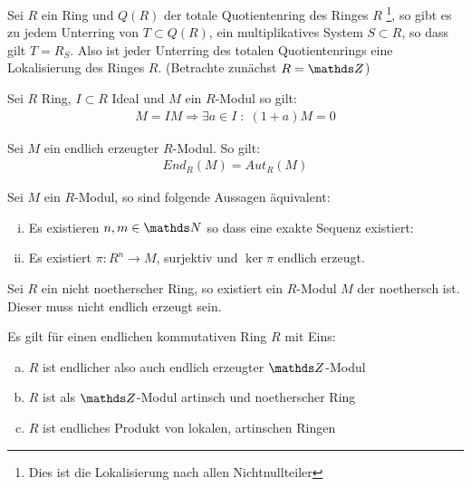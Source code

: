 \documentclass[ngerman, parskip=half, titlepage=false]{scrartcl}
\begin{document}
\begin{Beh}
  Sei $R$ ein Ring und $Q(R)$ der totale Quotientenring des Ringes $R$
  \footnote{Dies ist die Lokalisierung nach allen Nichtnullteiler},
  so gibt es zu  jedem Unterring von $T \subset Q(R)$, ein multiplikatives
  System $S \subset R$, so dass gilt $T = R_S$.
  Also ist jeder Unterring des totalen Quotientenrings eine Lokalisierung des 
  Ringes $R$. (Betrachte zunächst $R = \Z$)
\end{Beh}

\begin{Satz}
  Sei $R$ Ring, $I \subset R$ Ideal und $M$ ein $R$-Modul so gilt:\\
  \begin{gather*}
    M = IM \Rightarrow  \exists a \in I \; : \; (1+a)M=0
  \end{gather*}
\end{Satz}

\begin{Lem}
  Sei $M$ ein endlich erzeugter $R$-Modul. So gilt:
  \begin{gather*}
    End_R (M) = Aut_R(M) 
  \end{gather*}
\end{Lem}

\begin{Satz}
  Sei $M$ ein $R$-Modul, so sind folgende Aussagen äquivalent:\\
  \begin{enumerate}[i)]
    \item Es existieren $n,m \in \N$ so dass eine exakte Sequenz existiert:\\
    \item Es existiert $\pi : R^n \rightarrow M$, surjektiv und
      $\ker \pi$ endlich erzeugt.
    \end{enumerate}
  \end{Satz}

\begin{Beh}
  Sei $R$ ein nicht noetherscher Ring, so existiert ein $R$-Modul $M$ der
   noethersch ist. Dieser muss nicht endlich erzeugt sein.
\end{Beh}

\begin{Satz}
  Es gilt für einen endlichen kommutativen Ring $R$ mit Eins:\\
  \begin{enumerate}[a)]
    \item $R$ ist endlicher also auch endlich erzeugter $\Z$-Modul
    \item $R$ ist als $\Z$-Modul artinsch und noetherscher Ring
    \item $R$ ist endliches Produkt von lokalen, artinschen Ringen
  \end{enumerate}
\end{Satz}
\end{document}
